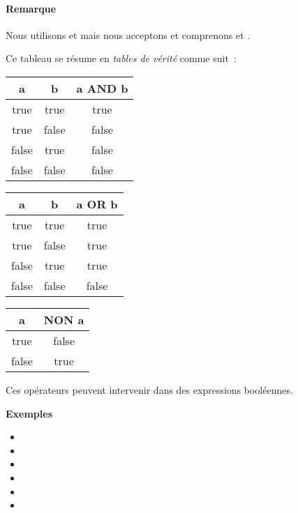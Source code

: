 			\paragraph{Remarque}
			Nous utilisons  et  mais nous acceptons et comprenons 
			 et . 

			Ce tableau se résume en \emph{tables de vérité}
			 comme suit~:

			
			\begin{center}
			\begin{tabular}{|ccc|}
				\hline
				\rowcolor{black!20}
				a & b & a AND b   \\
				\hline
				true & true & true \\\hline
				true & false & false \\\hline
				false & true & false \\\hline
				false & false & false \\\hline				
			\end{tabular}
			\qquad
			\begin{tabular}{|ccc|}
				\hline
				\rowcolor{black!20}
				a & b  & a OR b \\
				\hline
				true & true & true \\\hline
				true & false & true \\\hline
				false & true & true \\\hline
				false & false & false \\\hline				
			\end{tabular}
			\qquad
			\begin{tabular}{|cc|}
				\hline
				\rowcolor{black!20}
				a & NON a \\
				\hline
				true & false \\\hline
				false & true \\\hline
			\end{tabular}
			\end{center}

			Ces opérateurs peuvent intervenir dans des expressions booléennes.

			\textbf{Exemples}
			
			\begin{small}
			\begin{multicols}{2}
				\begin{itemize}
					\item {}
					\item {}
					\item {}
					\item {}
					\item {}
					\item {}
				\end{itemize}
			\end{multicols}
			\end{small}

